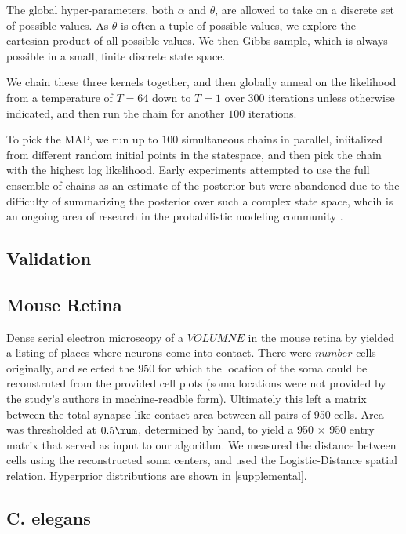 \documentclass{article}
\begin{document}
The global hyper-parameters, both $\alpha$ and $\theta$, are allowed
to take on a discrete set of possible values. As $\theta$ is often a
tuple of possible values, we explore the cartesian product of all
possible values. We then Gibbs sample, which is always possible in a 
small, finite discrete state space. 

We chain these three kernels together, and then globally
anneal on the likelihood from a temperature of $T=64$ down to 
$T=1$ over 300 iterations unless otherwise indicated, and
then run the chain for another $100$ iterations. 

To pick the MAP, we run up to $100$ simultaneous chains in parallel,
iniitalized from different random initial points in the statespace,
and then pick the chain with the highest log likelihood. Early
experiments attempted to use the full ensemble of chains as an
estimate of the posterior but were abandoned due to the difficulty of
summarizing the posterior over such a complex state space, whcih is an
ongoing area of research in the probabilistic modeling community
\autocite{}.


\subsection{Validation}


\subsection {Mouse Retina}
Dense serial electron microscopy of a $VOLUMNE$ in the mouse retina by
\autocite{Helmstaedter2013} yielded a listing of places where neurons
come into contact. There were $number$ cells originally, and selected
the $950$ for which the location of the soma could be reconstruted
from the provided cell plots (soma locations were not provided by the
study's authors in machine-readble form). Ultimately
this left a matrix between the total synapse-like contact area between
all pairs of 950 cells. Area was thresholded at $0.5\mum$, determined
by hand, to yield a 950 $\times$ 950 entry matrix that served as input
to our algorithm. We measured the distance between cells using
the reconstructed soma centers, and used the Logistic-Distance
spatial relation. Hyperprior distributions are shown in \ref{supplemental}. 

\subsection{C. elegans}
\end{document}
